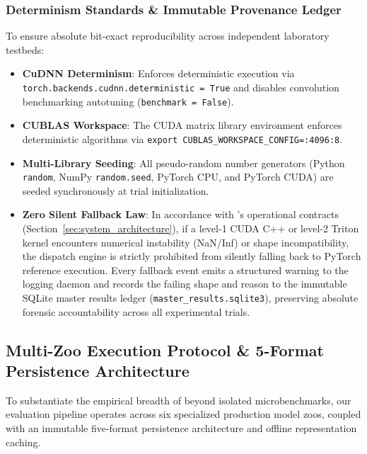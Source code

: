 \subsubsection{Determinism Standards \& Immutable Provenance Ledger}
To ensure absolute bit-exact reproducibility across independent laboratory testbeds:
\begin{itemize}
    \item \textbf{CuDNN Determinism}: Enforces deterministic execution via \texttt{torch.\allowbreak backends.\allowbreak cudnn.\allowbreak deterministic = True} and disables convolution benchmarking autotuning (\texttt{benchmark = False}).
    \item \textbf{CUBLAS Workspace}: The CUDA matrix library environment enforces deterministic algorithms via \texttt{export CUBLAS\_WORKSPACE\_CONFIG=:4096:8}.
    \item \textbf{Multi-Library Seeding}: All pseudo-random number generators (Python \texttt{random}, NumPy \texttt{random.seed}, PyTorch CPU, and PyTorch CUDA) are seeded synchronously at trial initialization.
    \item \textbf{Zero Silent Fallback Law}: In accordance with \neuralops{}'s operational contracts (Section~\ref{sec:system_architecture}), if a level-1 CUDA C++ or level-2 Triton kernel encounters numerical instability (NaN/Inf) or shape incompatibility, the dispatch engine is strictly prohibited from silently falling back to PyTorch reference execution. Every fallback event emits a structured warning to the logging daemon and records the failing shape and reason to the immutable SQLite master results ledger (\texttt{master\_results.sqlite3}), preserving absolute forensic accountability across all experimental trials.
\end{itemize}

\subsection{Multi-Zoo Execution Protocol \& 5-Format Persistence Architecture}
\label{sec:setup_multizoo_persistence}

To substantiate the empirical breadth of \neuralops{} beyond isolated microbenchmarks, our evaluation pipeline operates across six specialized production model zoos, coupled with an immutable five-format persistence architecture and offline representation caching.

